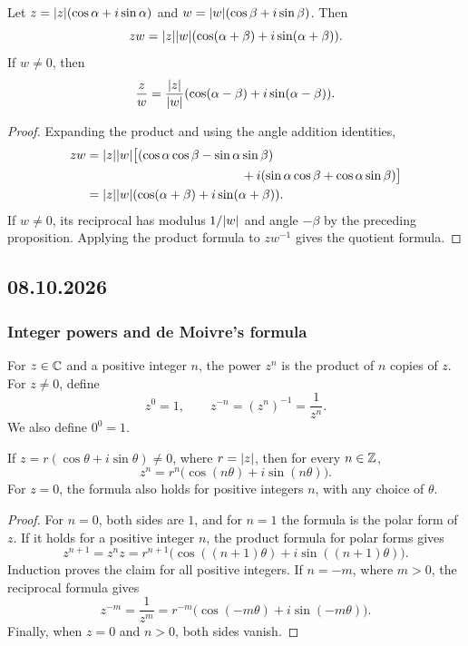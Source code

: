 \documentclass[11pt,a4paper]{amsart}
\begin{document}
\begin{proposition}
  Let \(z=\lvert z\rvert(\cos\alpha+i\sin\alpha)\) and
  \(w=\lvert w\rvert(\cos\beta+i\sin\beta)\). Then
  \[
    zw=\lvert z\rvert\lvert w\rvert
    (\cos(\alpha+\beta)+i\sin(\alpha+\beta)).
  \]
  If \(w\neq0\), then
  \[
    \frac zw=\frac{\lvert z\rvert}{\lvert w\rvert}
    (\cos(\alpha-\beta)+i\sin(\alpha-\beta)).
  \]
\end{proposition}

\begin{proof}
  Expanding the product and using the angle addition identities,
  \begin{align*}
    zw
    &=\abs{z}\abs{w}
    \bigl[(\cos\alpha\cos\beta-\sin\alpha\sin\beta)\\
      &\hspace{43mm}
    +i(\sin\alpha\cos\beta+\cos\alpha\sin\beta)\bigr]\\
    &=\abs{z}\abs{w}
    (\cos(\alpha+\beta)+i\sin(\alpha+\beta)).
  \end{align*}
  If \(w\neq0\), its reciprocal has modulus \(1/\lvert w\rvert\)
  and angle \(-\beta\) by the preceding proposition. Applying
  the product formula to \(zw^{-1}\) gives the quotient formula.
\end{proof}

\subsection{08.10.2026}

\subsubsection{Integer powers and de Moivre's formula}

\begin{definition}
  For \(z\in\mathbb{C}\) and a positive integer \(n\), the power \(z^n\)
  is the product of \(n\) copies of \(z\). For \(z\neq0\), define
  \[
    z^0=1,\qquad z^{-n}=(z^n)^{-1}=\frac1{z^n}.
  \]
  We also define \(0^0=1\).
\end{definition}

\begin{theorem}
  If \(z=r(\cos\theta+i\sin\theta)\neq0\), where \(r=\lvert z\rvert\), then
  for every \(n\in\mathbb{Z}\),
  \[
    z^n=r^n\bigl(\cos(n\theta)+i\sin(n\theta)\bigr).
  \]
  For \(z=0\), the formula also holds for positive integers \(n\),
  with any choice of \(\theta\).
\end{theorem}

\begin{proof}
  For \(n=0\), both sides are \(1\), and for \(n=1\) the formula is
  the polar form of \(z\). If it holds for a positive integer \(n\),
  the product formula for polar forms gives
  \[
    z^{n+1}=z^nz
    =r^{n+1}\bigl(\cos((n+1)\theta)+i\sin((n+1)\theta)\bigr).
  \]
  Induction proves the claim for all positive integers.
  If \(n=-m\), where \(m>0\), the reciprocal formula gives
  \[
    z^{-m}=\frac1{z^m}
    =r^{-m}\bigl(\cos(-m\theta)+i\sin(-m\theta)\bigr).
  \]
  Finally, when \(z=0\) and \(n>0\), both sides vanish.
\end{proof}
\end{document}
